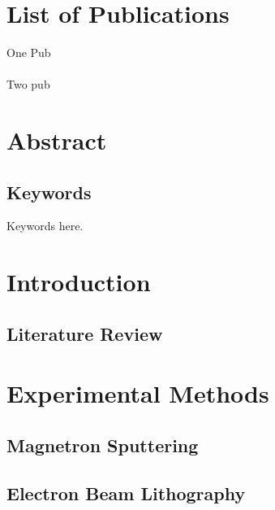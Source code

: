 \documentclass[a4paper,12pt,article,oneside,onecolumn,openany,draft]{memoir}
\begin{document}
\frontmatter




\tableofcontents*

\newpage
\listoffigures

\newpage
\listoftables

\newpage
\chapter*{List of Publications}
One Pub\\
\\
Two pub\\

\newpage
\chapter*{Abstract}
\lipsum[1-2]

\section*{Keywords}
Keywords here.

\mainmatter
\pagestyle{headings}
\chapter{Introduction}
\thispagestyle{simple}
\lipsum[1-5]

\section{Literature Review}
\lipsum[1-5]

\newpage
\chapter{Experimental Methods}
\thispagestyle{simple}
\lipsum[1]

\section{Magnetron Sputtering}
\lipsum[1-3]

\section{Electron Beam Lithography}
\lipsum[1-2]
\end{document}
